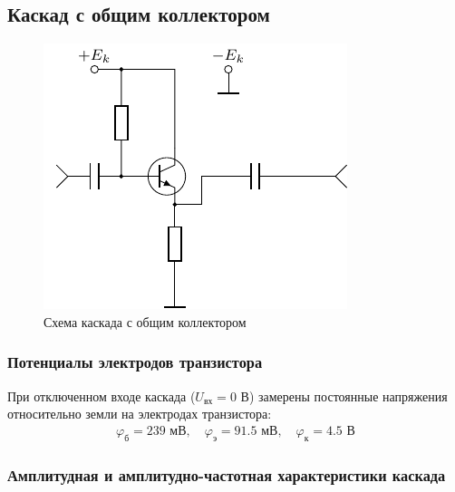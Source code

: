 

\subsection{Каскад с общим коллектором}
\begin{figure}[h!]
	\centering
	\includegraphics[scale=1.75]{ris/common_collector}
	\caption{Схема каскада с общим коллектором}
	\label{fig:17}
\end{figure}

\subsubsection{Потенциалы электродов транзистора}

При отключенном входе каскада ($U_{\text{вх}}=0$ В) замерены постоянные напряжения относительно земли на электродах транзистора:
\begin{gather*}
		\varphi_\text{б}=239 \text{ мВ}, \quad
		\varphi_\text{э}=91.5 \text{ мВ}, \quad
		\varphi_\text{к}=4.5 \text{ В}
\end{gather*}




\subsubsection{Амплитудная и амплитудно-частотная характеристики каскада}

